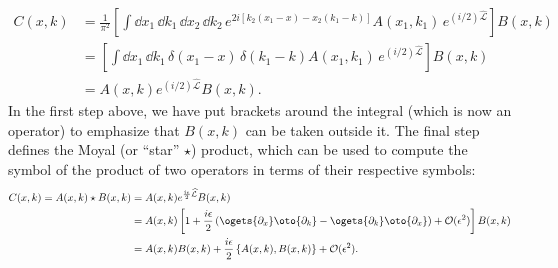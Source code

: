 %
\begin{equation}
  \begin{aligned}
    C(x, k) &= \frac{1}{\pi^{2}} \left[\int \dd{x_{1}}\, \dd{k_{1}}\, \dd{x_{2}}\, \dd{k_{2}}\,e^{2i[k_{2}(x_{1} - x) - x_{2}(k_{1} - k)]} A(x_{1}, k_{1})\, e^{(i/2)\widehat{\mathcal{L}}}\right] B(x, k)\\
                     &= \left[\int \dd{x_{1}}\, \dd{k_{1}}\, \delta(x_{1} - x)\,\delta(k_{1} - k) A(x_{1}, k_{1})\, e^{(i/2)\widehat{\mathcal{L}}}\right] B(x, k)\\
                     &= A(x, k)e^{(i/2)\widehat{\mathcal{L}}} B(x, k).
  \end{aligned}
\end{equation}
%
In the first step above, we have put brackets around the integral (which is now an operator) to emphasize that $B(x, k)$ can be taken outside it.
The final step defines the Moyal (or ``star'' $\star$) product, which can be used to compute the symbol of the product of two operators in terms of their respective symbols:
%
\begin{equation}
  \begin{aligned}
    C(x, k) = A(x, k)\star B(x, k) &= A(x, k)e^{\frac{i\epsilon}{2}\widehat{\mathcal{L}}} B(x, k)\\
                                                             &= A(x, k)\left[1 + \frac{i\epsilon}{2}\left(\ogets{\partial_{x}}\oto{\partial_{k}} - \ogets{\partial_{k}}\oto{\partial_{x}}\right) + \mathcal{O}(\epsilon^{2}) \right] B(x, k)\\
                                                             &= A(x, k)B(x, k) + \frac{i\epsilon}{2}\left\{A(x, k), B(x, k)\right\} + \mathcal{O}(\epsilon^{2}).
  \end{aligned}
\end{equation}
